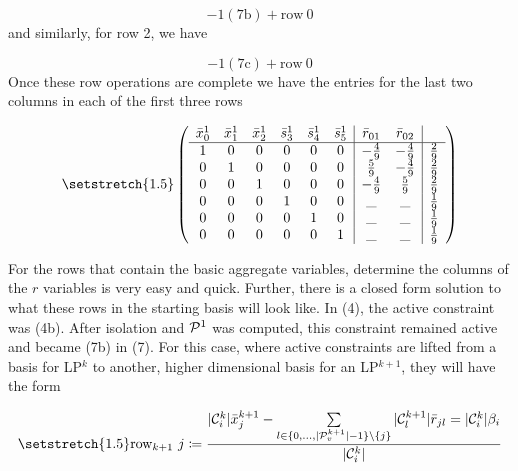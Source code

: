 \documentclass[11pt]{article} %
\newcommand{\cP}{{\cal P}}
\newcommand{\cC}{{\cal C}}
\begin{document}
	\begin{equation}
	-1(7\text{b}) + \text{row} \ 0
	\end{equation}
	and similarly, for row 2, we have
	
	\begin{equation}
	-1(7\text{c}) + \text{row} \ 0
	\end{equation}
	Once these row operations are complete we have the entries for the last two columns in each of the first three rows 
	
	\begin{equation}\setstretch{1.5}
	\begin{pmatrix}
	\begin{array}{cccccc|cc|c}
		\bar{x}^1_0 & \bar{x}^1_1 & \bar{x}^1_2 & \bar{s}^1_3 & \bar{s}^1_4 & \bar{s}^1_5 & \bar{r}_{01} & \bar{r}_{02} \\
	\hline
	1 & 0 & 0 & 0 & 0 & 0 & -\frac{4}{9} & -\frac{4}{9} & \frac{2}{9} \\ 
	0 & 1 & 0 & 0 & 0 & 0 &  \frac{5}{9} & -\frac{4}{9} & \frac{2}{9} \\ 
	0 & 0 & 1 & 0 & 0 & 0 & -\frac{4}{9} & \frac{5}{9} & \frac{2}{9} \\ 
	0 & 0 & 0 & 1 & 0 & 0 & \_ & \_ & \frac{1}{9} \\ 
	0 & 0 & 0 & 0 & 1 & 0 & \_ & \_ & \frac{1}{9} \\
	0 & 0 & 0 & 0 & 0 & 1 & \_ & \_ & \frac{1}{9} \\
	\end{array}
	\end{pmatrix}
	\end{equation}
	
	For the rows that contain the basic aggregate variables, determine the columns of the $r$ variables is very easy and quick.  Further, there is a closed form solution to what these rows in the starting basis will look like.  In (4), the active constraint was (4b).  After isolation and $\cP^1$ was computed, this constraint remained active and became (7b) in (7).  For this case, where active constraints are lifted from a basis for LP$^k$ to another, higher dimensional basis for an LP$^{k + 1}$, they will have the form 
	
	\begin{equation}\setstretch{1.5}
	\text{row}_{k + 1} \ j \coloneqq \frac{|\cC_i^{k}|\bar{x}_j^{k + 1} - \sum\limits_{l \in \{0, \dots, |\cP^{k + 1}_v| - 1\} \backslash \{j\}}|\cC^{k + 1}_l|\bar{r}_{jl} = |\cC^{k}_i|\beta_i}{|\cC_i^{k}|}
	\end{equation}
	
\end{document}
